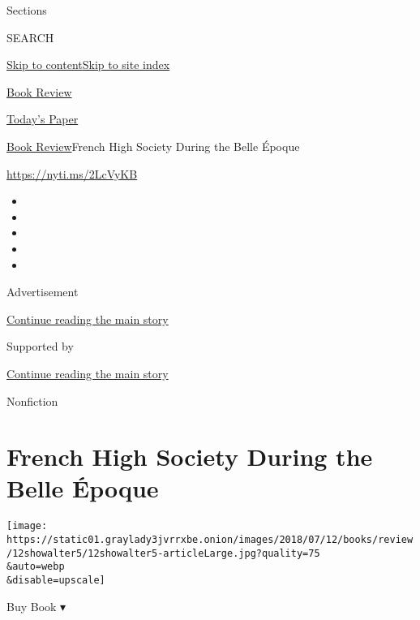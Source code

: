 Sections

SEARCH

\protect\hyperlink{site-content}{Skip to
content}\protect\hyperlink{site-index}{Skip to site index}

\href{https://www.nytimes3xbfgragh.onion/section/books/review}{Book
Review}

\href{https://myaccount.nytimes3xbfgragh.onion/auth/login?response_type=cookie\&client_id=vi}{}

\href{https://www.nytimes3xbfgragh.onion/section/todayspaper}{Today's
Paper}

\href{/section/books/review}{Book Review}\textbar{}French High Society
During the Belle Époque

\url{https://nyti.ms/2LcVyKB}

\begin{itemize}
\item
\item
\item
\item
\item
\end{itemize}

Advertisement

\protect\hyperlink{after-top}{Continue reading the main story}

Supported by

\protect\hyperlink{after-sponsor}{Continue reading the main story}

Nonfiction

\hypertarget{french-high-society-during-the-belle-uxe9poque}{%
\section{French High Society During the Belle
Époque}\label{french-high-society-during-the-belle-uxe9poque}}

\texttt{[image: https://static01.graylady3jvrrxbe.onion/images/2018/07/12/books/review/12showalter5/12showalter5-articleLarge.jpg?quality=75\\\&auto=webp\\\&disable=upscale]}

Buy Book ▾


